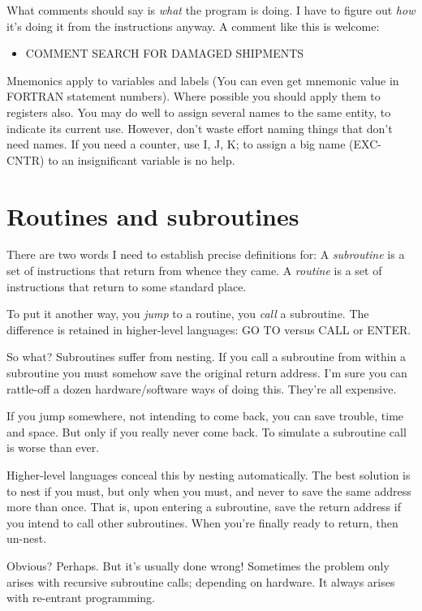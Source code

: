 \documentclass[b5paper, oneside]{book}
\begin{document}
What comments should say is {\em what} the program is doing. I have to figure out {\em how} it's doing it from the instructions anyway. A comment like this is welcome:\begin{itemize}
   \item COMMENT SEARCH FOR DAMAGED SHIPMENTS\end{itemize}

Mnemonics apply to variables and labels (You can even get mnemonic value in FORTRAN statement numbers). Where possible you should apply them to registers also. You may do well to assign several names to the same entity, to indicate its current use. However, don't waste effort naming things that don't need names. If you need a counter, use I, J, K; to assign a big name (EXC-CNTR) to an insignificant variable is no help.

\section{Routines and subroutines}
There are two words I need to establish precise definitions for: A {\em subroutine} is a set of instructions that return from whence they came. A {\em routine} is a set of instructions that return to some standard place.

To put it another way, you {\em jump} to a routine, you {\em call} a subroutine. The difference is retained in higher-level languages: GO TO versus CALL or ENTER.

So what? Subroutines suffer from nesting. If you call a subroutine from within a subroutine you must somehow save the original return address. I'm sure you can rattle-off a dozen hardware/software ways of doing this. They're all expensive.

If you jump somewhere, not intending to come back, you can save trouble, time and space. But only if you really never come back. To simulate a subroutine call is worse than ever.

Higher-level languages conceal this by nesting automatically. The best solution is to nest if you must, but only when you must, and never to save the same address more than once. That is, upon entering a subroutine, save the return address if you intend to call other subroutines. When you're finally ready to return, then un-nest.

Obvious? Perhaps. But it's usually done wrong! Sometimes the problem only arises with recursive subroutine calls; depending on hardware. It always arises with re-entrant programming.
\end{document}
